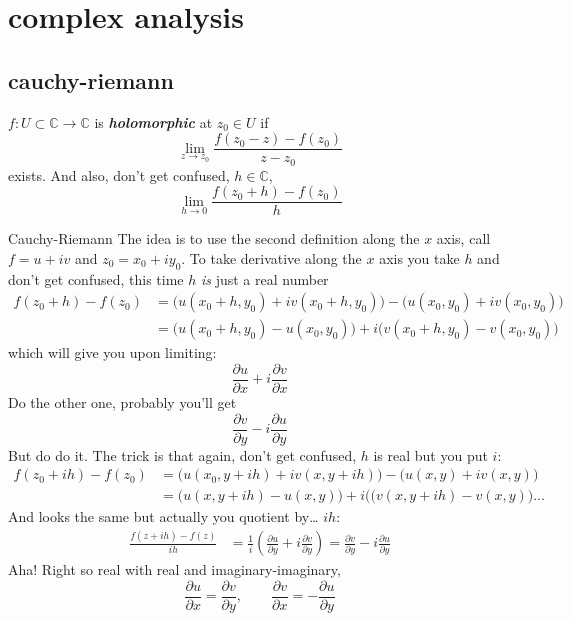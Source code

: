 \section{complex analysis}

\subsection{cauchy-riemann}

\(f:U \subset \mathbb{C} \to \mathbb{C}\) is \textit{\textbf{holomorphic}} at \(z_0\in U\) if
\[\lim_{z \to z_0} \frac{f(z_0-z)-f(z_0)}{z-z_0}\]
exists. And also, don't get confused, \(h\in \mathbb{C}\),
\[\lim_{h \to 0} \frac{f(z_0+h)-f(z_0)}{h}\]

\begin{thing7}{Cauchy-Riemann}\leavevmode
The idea is to use the second definition along the \(x\) axis, call \(f=u+iv\) and  \(z_0=x_0+iy_0\). To take derivative along the \(x\) axis you take \(h\) and don't get confused, this time \(h\) \textit{is} just a real number
\begin{align*}f(z_0+h)-f(z_0)&=\Big(u(x_0+h,y_0)+iv(x_0+h,y_0)\Big)-\Big(u(x_0,y_0)+iv(x_0,y_0)\Big)\\
&=\Big(u(x_0+h,y_0)-u(x_0,y_0)\Big)+i\Big(v(x_0+h,y_0)-v(x_0,y_0)\Big)
\end{align*}
which will give you upon limiting:
\[\frac{\partial u}{\partial x}+i\frac{\partial v}{\partial x}\]
Do the other one, probably you'll get
\[\frac{\partial v}{\partial y}-i\frac{\partial u}{\partial y}\]
But do do it. The trick is that again, don't get confused, \(h\) is real but you put \(i\):
\begin{align*}
f(z_0+ih)-f(z_0)&=\Big(u(x_0,y+ih)+iv(x,y+ih)\Big)-\Big(u(x,y)+iv(x,y)\Big)\\
&=\Big(u(x,y+ih)-u(x,y)\Big)+i\Big((v(x,y+ih)-v(x,y)\Big)\ldots
\end{align*}
And looks the same but actually you quotient by… \(ih\):
\begin{align*}\frac{f(z+ih)-f(z)}{ih}&=\frac{1}{i}\left(\frac{\partial u}{\partial y}+i\frac{\partial v}{\partial y}\right)=\frac{\partial v}{\partial y}-i\frac{\partial u}{\partial y}
	\end{align*}
Aha! Right so real with real and imaginary-imaginary,
\[\frac{\partial u}{\partial x}=\frac{\partial v}{\partial y},\qquad \frac{\partial v}{\partial x}=-\frac{\partial u}{\partial y}\]
\end{thing7}





